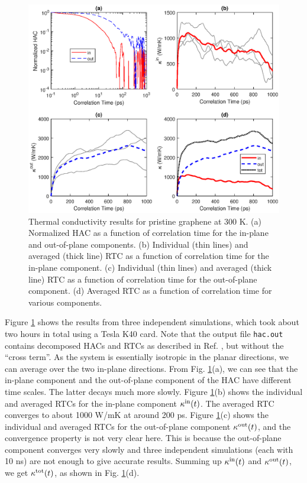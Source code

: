 \documentclass[12pt,a4paper]{report}
\begin{document}
\begin{figure}[ht]
\begin{center}
\includegraphics[width=\columnwidth]{ex3.eps}
\caption{Thermal conductivity results for pristine graphene at 300 K. (a) Normalized HAC as a function of correlation time for the in-plane and out-of-plane components. (b) Individual (thin lines) and averaged (thick line) RTC as a function of correlation time for the in-plane component. (c) Individual (thin lines) and averaged (thick line) RTC as a function of correlation time for the out-of-plane component. (d) Averaged RTC as a function of correlation time for various components. }
\label{figure:ex3}
\end{center}
\end{figure}

Figure \ref{figure:ex3} shows the results from three independent simulations, which took about two hours in total using a Tesla K40 card. Note that the output file \verb"hac.out" contains decomposed HACs and RTCs as described in Ref. \cite{fan2017prb}, but without the ``cross term''. As the system is essentially isotropic in the planar directions, we can average over the two in-plane directions. From Fig. \ref{figure:ex3}(a), we can see that the in-plane component and the out-of-plane component of the HAC have different time scales. The latter decays much more slowly. Figure \ref{figure:ex3}(b) shows the individual and averaged RTCs for the in-plane component $\kappa^{\rm in}(t)$. The averaged RTC converges to about 1000 W/mK at around 200 ps. Figure \ref{figure:ex3}(c) shows the individual and averaged RTCs for the out-of-plane component $\kappa^{\rm out}(t)$, and the convergence property is not very clear here. This is because the out-of-plane component converges very slowly \cite{fan2017prb} and three independent simulations (each with 10 ns) are not enough to give accurate results. Summing up $\kappa^{\rm in}(t)$ and $\kappa^{\rm out}(t)$, we get $\kappa^{\rm tot}(t)$, as shown in Fig. \ref{figure:ex3}(d).
\end{document}
